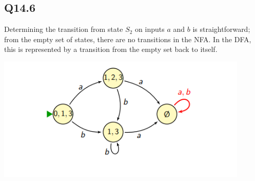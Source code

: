 \documentclass{article}
\begin{document}
\subsection*{Q14.6}
Determining the transition from state \( S_2 \) on inputs \( a \) and \( b \) is straightforward; from the empty set of states, there are no transitions in the NFA. In the DFA, this is represented by a transition from the empty set back to itself.
\begin{center}
    \includegraphics[width=12cm]{6.png}
\end{center}
\newpage
{}
\end{document}
